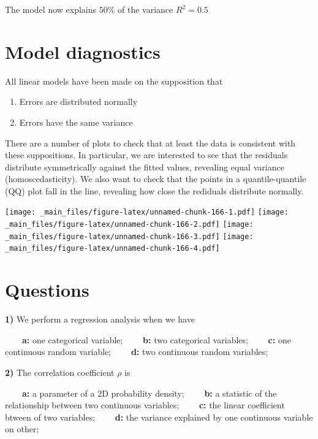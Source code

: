 \documentclass[
]{book}
\begin{document}
The model now explains \(50\%\) of the variance \(R^2=0.5\)

\hypertarget{model-diagnostics}{%
\section{Model diagnostics}\label{model-diagnostics}}

All linear models have been made on the supposition that

\begin{enumerate}
\def\labelenumi{\arabic{enumi}.}
\item
  Errors are distributed normally
\item
  Errors have the same variance
\end{enumerate}

There are a number of plots to check that at least the data is consistent with these suppositions. In particular, we are interested to see that the residuals distribute symmetrically against the fitted values, revealing equal variance (homoscedasticity). We also want to check that the points in a quantile-quantile (QQ) plot fall in the line, revealing how close the rediduals distribute normally.

\texttt{[image: \_main\_files/figure-latex/unnamed-chunk-166-1.pdf]} \texttt{[image: \_main\_files/figure-latex/unnamed-chunk-166-2.pdf]} \texttt{[image: \_main\_files/figure-latex/unnamed-chunk-166-3.pdf]} \texttt{[image: \_main\_files/figure-latex/unnamed-chunk-166-4.pdf]}

\hypertarget{questions-14}{%
\section{Questions}\label{questions-14}}

\textbf{1)} We perform a regression analysis when we have

\textbf{\(\qquad\)a:} one categorical variable;
\textbf{\(\qquad\)b:} two categorical variables;
\textbf{\(\qquad\)c:} one continuous random variable;
\textbf{\(\qquad\)d:} two continuous random variables;

\textbf{2)} The correlation coefficient \(\rho\) is

\textbf{\(\qquad\)a:} a parameter of a 2D probability density;
\textbf{\(\qquad\)b:} a statistic of the relationship between two continuous variables;
\textbf{\(\qquad\)c:} the linear coefficient btween of two variables;
\textbf{\(\qquad\)d:} the variance explained by one continuous variable on other;
\end{document}
